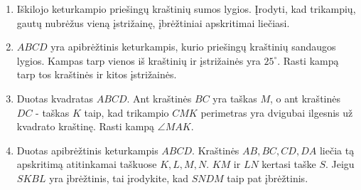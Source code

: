 \begin{enumerate}
  \item Iškilojo keturkampio priešingų kraštinių sumos lygios.
    Įrodyti, kad trikampių, gautų nubrėžus vieną įstrižainę, 
    įbrėžtiniai apskritimai liečiasi.
  \item $ABCD$ yra apibrėžtinis keturkampis, kurio priešingų
    kraštinių sandaugos lygios. Kampas tarp vienos iš
    kraštinių ir įstrižainės yra $25^\circ$. Rasti kampą tarp
    tos kraštinės ir kitos įstrižainės.
  \item Duotas kvadratas $ABCD$. Ant kraštinės $BC$ yra taškas
    $M$, o ant kraštinės $DC$ - taškas $K$ taip, kad trikampio
    $CMK$ perimetras yra dvigubai ilgesnis už kvadrato
    kraštinę. Rasti kampą $\angle MAK$.
  \item Duotas apibrėžtinis keturkampis $ABCD$. Kraštinės $AB,
    BC, CD, DA$ liečia tą apskritimą atitinkamai taškuose $K,
    L, M, N$. $KM$ ir $LN$ kertasi taške $S$. Jeigu $SKBL$ yra
    įbrėžtinis, tai įrodykite, kad $SNDM$ taip pat įbrėžtinis.

\end{enumerate}

